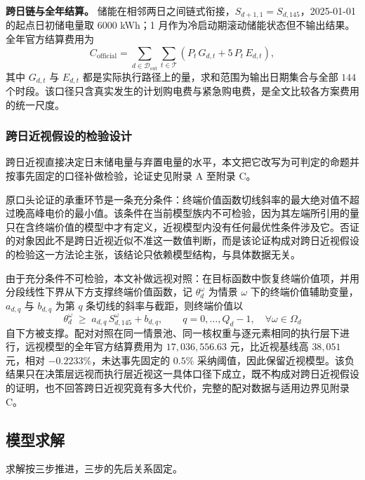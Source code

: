 \textbf{跨日链与全年结算。} 储能在相邻两日之间链式衔接，$S_{d+1,1}=S_{d,145}$，2025-01-01 的起点日初储电量取 $6000$ kWh；1 月作为冷启动期滚动储能状态但不输出结果。全年官方结算费用为
\begin{equation}
C_{\mathrm{official}} = \sum_{d \in \mathcal{D}_{\mathrm{out}}} \sum_{t \in \mathcal{T}} \left( P_t\, G_{d,t} + 5\, P_t\, E_{d,t} \right),\label{eq:official2}
\end{equation}
其中 $G_{d,t}$ 与 $E_{d,t}$ 都是实际执行路径上的量，求和范围为输出日期集合与全部 $144$ 个时段。该口径只含真实发生的计划购电费与紧急购电费，是全文比较各方案费用的统一尺度。

\subsubsection{跨日近视假设的检验设计}

跨日近视直接决定日末储电量与弃置电量的水平，本文把它改写为可判定的命题并按事先固定的口径补做检验，论证史见附录 A 至附录 C。

原口头论证的承重环节是一条充分条件：终端价值函数切线斜率的最大绝对值不超过晚高峰电价的最小值。该条件在当前模型族内不可检验，因为其左端所引用的量只在含终端价值的模型中才有定义，近视模型内没有任何最优性条件涉及它。否证的对象因此不是跨日近视近似不准这一数值判断，而是该论证构成对跨日近视假设的检验这一方法论主张，该结论只依赖模型结构，与具体数据无关。

由于充分条件不可检验，本文补做远视对照：在目标函数中恢复终端价值项，并用分段线性下界从下方支撑终端价值函数，记 $\theta^{\omega}_{d}$ 为情景 $\omega$ 下的终端价值辅助变量，$a_{d,q}$ 与 $b_{d,q}$ 为第 $q$ 条切线的斜率与截距，则终端价值以
\begin{equation}
\theta^{\omega}_{d} \;\ge\; a_{d,q}\, S^{\omega}_{d,145} + b_{d,q},
\qquad q = 0,\ldots,Q_d-1,\quad \forall \omega \in \Omega_d\label{eq:terminal2}
\end{equation}
自下方被支撑。配对对照在同一情景池、同一核权重与逐元素相同的执行层下进行，远视模型的全年官方结算费用为 $17{,}036{,}556.63$ 元，比近视基线高 $38{,}051$ 元，相对 $-0.2233\%$，未达事先固定的 $0.5\%$ 采纳阈值，因此保留近视模型。该负结果只在决策层远视而执行层近视这一具体口径下成立，既不构成对跨日近视假设的证明，也不回答跨日近视究竟有多大代价，完整的配对数据与适用边界见附录 C。

\subsection{模型求解}

求解按三步推进，三步的先后关系固定。


